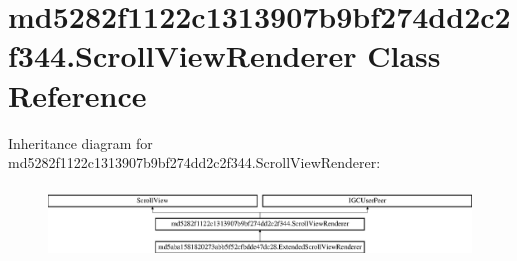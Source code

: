 \hypertarget{classmd5282f1122c1313907b9bf274dd2c2f344_1_1ScrollViewRenderer}{}\section{md5282f1122c1313907b9bf274dd2c2f344.\+Scroll\+View\+Renderer Class Reference}
\label{classmd5282f1122c1313907b9bf274dd2c2f344_1_1ScrollViewRenderer}
Inheritance diagram for md5282f1122c1313907b9bf274dd2c2f344.\+Scroll\+View\+Renderer\+:\begin{figure}[H]
\begin{center}
\leavevmode
\includegraphics[height=1.948956cm]{classmd5282f1122c1313907b9bf274dd2c2f344_1_1ScrollViewRenderer}
\end{center}
\end{figure}
